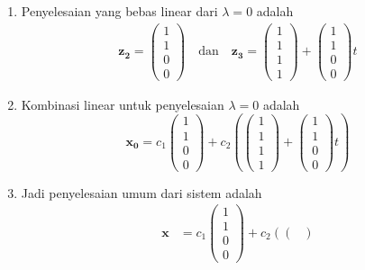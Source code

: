 \documentclass[a4paper]{article}
\theoremstyle{definisi}
\numberwithin{equation}{section}
\begin{document}
\begin{enumerate}
\begin{enumerate}[label=Langkah \arabic*: ,leftmargin=*]
      \item Penyelesaian yang bebas linear dari $\lambda=0$ adalah
      \begin{align*}
        \mathbf{z_2}=\begin{pmatrix}
          1\\1\\0\\0
        \end{pmatrix}\quad\text{dan}\quad
        \mathbf{z_3}=\begin{pmatrix}
          1\\1\\1\\1
        \end{pmatrix}+\begin{pmatrix}
          1\\1\\0\\0
        \end{pmatrix}t
      \end{align*}
      \item Kombinasi linear untuk penyelesaian $\lambda=0$ adalah
      \begin{equation*}
        \mathbf{x_0}=c_1\begin{pmatrix}
          1\\1\\0\\0
        \end{pmatrix}+c_2\left(\begin{pmatrix}
          1\\1\\1\\1
        \end{pmatrix}+\begin{pmatrix}
          1\\1\\0\\0
        \end{pmatrix}t\right)
      \end{equation*}
      \item Jadi penyelesaian umum dari sistem adalah
      \begin{equation*}
        \begin{split}
          \mathbf{x}&=c_1\begin{pmatrix}
            1\\1\\0\\0
          \end{pmatrix}+c_2\left(\begin{pmatrix}

\end{pmatrix}
\end{split}
\end{equation*}
\end{enumerate}
\end{enumerate}
\end{document}
